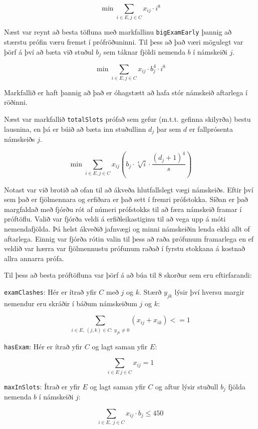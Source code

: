 \documentclass[12pt]{article}
\begin{document}
$$\min \sum_{i \in E,j \in C } x_{ij} \cdot i^8$$

Næst var reynt að besta töfluna með markfallinu \texttt{bigExamEarly} þannig að stærstu prófin væru fremst í prófröðuninni. Til þess að það væri mögulegt var þörf á því að bæta við stuðul $b_{j}$ sem táknar fjöldi nemenda $ b $ í námskeiði $ j $.

$$\min \sum_{i \in E, j \in C} x_{ij} \cdot b^{4}_j \cdot i^8$$

Markfallið er haft þannig að það er óhagstætt að hafa stór námskeið aftarlega í röðinni.

\medskip
Næst var markfallið \texttt{totalSlots} prófað sem gefur (m.t.t. gefinna skilyrða) bestu lausnina, en þá er búið að bæta inn stuðullinn $ d_{j} $ þar sem $ d $ er fallprósenta námskeiðs $ j $.



$$\min \sum_{i \in E, j \in C} x_{ij} \left(b_j \cdot \sqrt[4]{i} \cdot \dfrac{(d_j + 1)^4}{s} \right)$$

Notast var við brotið að ofan til að ákveða hlutfallslegt vægi námskeiðs. Eftir því sem það er fjölmennara og erfiðara er það sett í fremri prófstokka. Síðan er það margfaldað með fjórðu rót af númeri prófstokks til að færa námskeið framar í próftöflu. Valið var fjórða veldi á erfiðleikastiginu til að vega upp á móti nemendafjölda. Þá helst ákveðið jafnvægi og minni námskeiðin lenda ekki allt of aftarlega. Einnig var fjórða rótin valin til þess að raða prófunum framarlega en ef veldið var hærra var fjölmennustu prófunum raðað í fyrstu stokkana á kostnað allra annarra prófa.

\medskip

Til þess að besta próftöfluna var þörf á að búa til 8 skorður sem eru eftirfarandi:

\texttt{examClashes}: Hér er ítrað yfir $ C $ með $ j $ og $ k $. Stærð $ y_{jk} $ lýsir því hversu margir nemendur eru skráðir í báðum námskeiðum $ j $ og $ k $:

$$\sum_{i \in E, ~(j,k)\in C: ~y_{jk} \neq 0} (x_{ij} + x_{ik}) <= 1$$

\texttt{hasExam}: Hér er ítrað yfir $ C $ og lagt saman yfir $ E $:

$$\sum_{ i \in E ~ j \in C} x_{ij} = 1 $$

\texttt{maxInSlots}: Ítrað er yfir $ E $ og lagt saman yfir $ C $ og aftur lýsir stuðull $b_{j}$ fjölda nemenda $ b $ í námskeiði $ j $:

$$\sum_{i \in E, ~ j \in C} x_{ij} \cdot b_{j} \leq 450 $$
\end{document}

